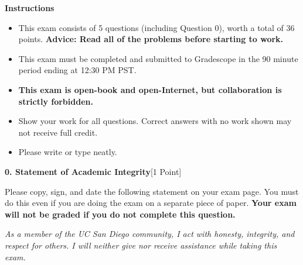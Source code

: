 \documentclass{article}
\begin{document}
\vspace{1em}

\hline

\vspace{.15in}

\textbf{Instructions}

\begin{itemize}
    \item This exam consists of 5 questions (including Question 0), worth a total of 36 points. \textbf{Advice: Read all of the problems before starting to work.}
    \item This exam must be completed and submitted to Gradescope in the 90 minute period ending at 12:30 PM PST.
    \item \textbf{This exam is open-book and open-Internet, but collaboration is strictly forbidden.}
    \item Show your work for all questions. Correct answers with no work shown may not receive full credit.
    \item Please write or type neatly.
\end{itemize}

\vspace{.15in}

\hline

\vspace{.3in}

\textbf{0. Statement of Academic Integrity}[1 Point]

Please copy, sign, and date the following statement on your exam page. You must do this even if you are doing the exam on a separate piece of paper. \textbf{Your exam will not be graded if you do not complete this question.}

\textit{As a member of the UC San Diego community, I act with honesty, integrity, and respect for others. I will neither give nor receive assistance while taking this exam.}
\end{document}
